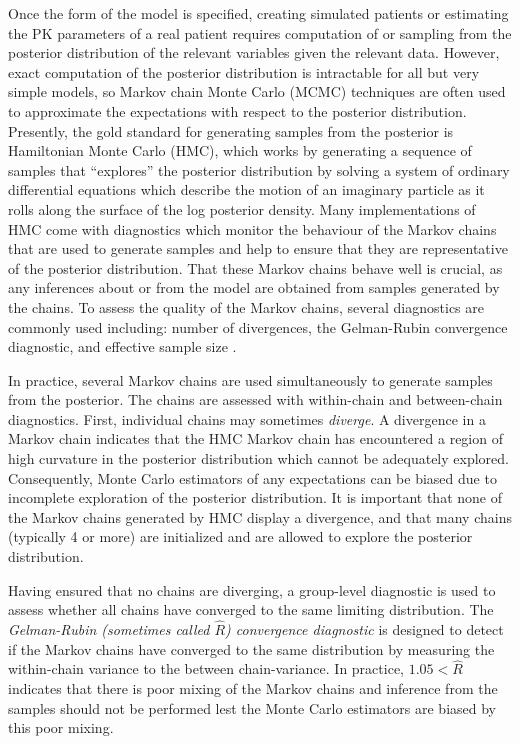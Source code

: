 Once the form of the model is specified, creating simulated patients or estimating the PK parameters of a real patient requires computation of or sampling from the posterior distribution of the relevant variables given the relevant data. However, exact computation of the posterior distribution is intractable for all but very simple models, so Markov chain Monte Carlo (MCMC) techniques are often used to approximate the expectations with respect to the posterior distribution.  Presently, the gold standard for generating samples from the posterior is Hamiltonian Monte Carlo (HMC), which works by generating a sequence of samples that ``explores'' the posterior distribution by solving a system of ordinary differential equations which describe the motion of an imaginary particle as it rolls along the surface of the log posterior density.  Many implementations of HMC come with diagnostics which monitor the behaviour of the Markov chains that are used to generate samples and help to ensure that they are representative of the posterior distribution. That these Markov chains behave well is crucial, as any inferences about or from the model are obtained from samples generated by the chains. To assess the quality of the Markov chains, several diagnostics are commonly used including: number of divergences, the Gelman-Rubin convergence diagnostic, and effective sample size \cite{betancourt2018conceptual}.

In practice, several Markov chains are used simultaneously to generate samples from the posterior. The chains are assessed with within-chain and between-chain diagnostics. First, individual chains may sometimes \textit{diverge}. A divergence in a Markov chain indicates that the HMC Markov chain has encountered a region of high curvature in the posterior distribution which cannot be adequately explored.  Consequently, Monte Carlo estimators of any expectations can be biased due to incomplete exploration of the posterior distribution.  It is important that none of the Markov chains generated by HMC display a divergence, and that many chains (typically 4 or more) are initialized and are allowed to explore the posterior distribution. 

Having ensured that no chains are diverging, a group-level diagnostic is used to assess whether all chains have converged to the same limiting distribution.  The \textit{Gelman-Rubin (sometimes called $\hat{R}$) convergence diagnostic} is designed to detect if the Markov chains have converged to the same distribution by measuring the within-chain variance to the between chain-variance. In practice, $1.05<\hat{R}$ indicates that there is poor mixing of the Markov chains and inference from the samples should not be performed lest the Monte Carlo estimators are biased by this poor mixing.

